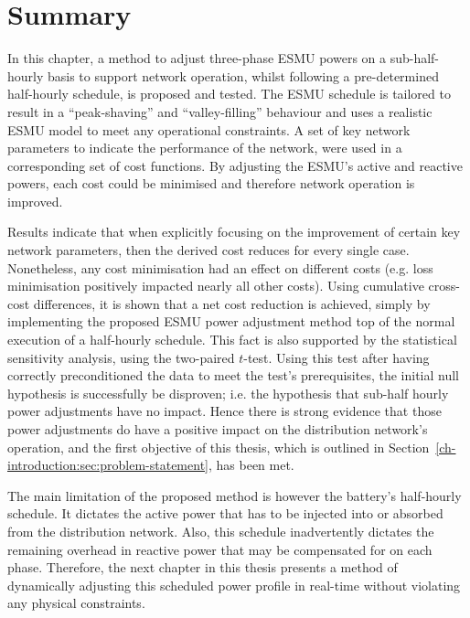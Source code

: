 \section{Summary}
\label{ch1:sec:summary}

In this chapter, a method to adjust three-phase ESMU powers on a sub-half-hourly basis to support network operation, whilst following a pre-determined half-hourly schedule, is proposed and tested.
The ESMU schedule is tailored to result in a ``peak-shaving'' and ``valley-filling'' behaviour and uses a realistic ESMU model to meet any operational constraints.
A set of key network parameters to indicate the performance of the network, were used in a corresponding set of cost functions.
By adjusting the ESMU's active and reactive powers, each cost could be minimised and therefore network operation is improved.

Results indicate that when explicitly focusing on the improvement of certain key network parameters, then the derived cost reduces for every single case.
Nonetheless, any cost minimisation had an effect on different costs (e.g. loss minimisation positively impacted nearly all other costs).
Using cumulative cross-cost differences, it is shown that a net cost reduction is achieved, simply by implementing the proposed ESMU power adjustment method top of the normal execution of a half-hourly schedule.
This fact is also supported by the statistical sensitivity analysis, using the two-paired $t$-test.
Using this test after having correctly preconditioned the data to meet the test's prerequisites, the initial null hypothesis is successfully be disproven; i.e. the hypothesis that sub-half hourly power adjustments have no impact.
Hence there is strong evidence that those power adjustments do have a positive impact on the distribution network's operation, and the first objective of this thesis, which is outlined in Section~\ref{ch-introduction:sec:problem-statement}, has been met.

The main limitation of the proposed method is however the battery's half-hourly schedule.
It dictates the active power that has to be injected into or absorbed from the distribution network.
Also, this schedule inadvertently dictates the remaining overhead in reactive power that may be compensated for on each phase.
Therefore, the next chapter in this thesis presents a method of dynamically adjusting this scheduled power profile in real-time without violating any physical constraints.
